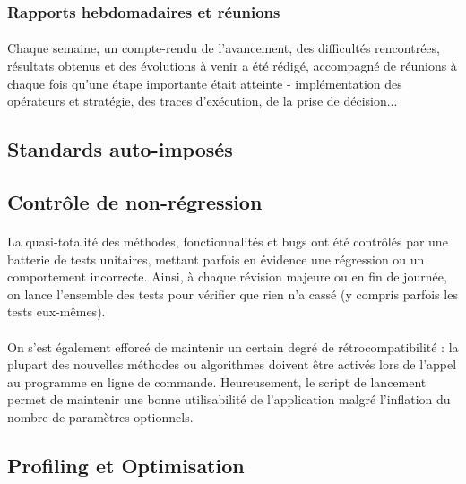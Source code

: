 \documentclass[a4paper,10pt]{report}
\begin{document}
\subsubsection{Rapports hebdomadaires et réunions}
\paragraph{}
  Chaque semaine, un compte-rendu de l'avancement, des difficultés rencontrées,
résultats obtenus et des évolutions à venir a été rédigé, accompagné de
réunions à chaque fois qu'une étape importante était atteinte - implémentation
des opérateurs et stratégie, des traces d'exécution, de la prise de décision...


\subsection{Standards auto-imposés}
\paragraph{}



\subsection{Contrôle de non-régression}
\paragraph{}
  La quasi-totalité des méthodes, fonctionnalités et bugs ont été contrôlés par
une batterie de tests unitaires, mettant parfois en évidence une régression ou
un comportement incorrecte. Ainsi, à chaque révision majeure ou en fin de
journée, on lance l'ensemble des tests pour vérifier que rien n'a cassé (y
compris parfois les tests eux-mêmes).

\paragraph{}
  On s'est également efforcé de maintenir un certain degré de rétrocompatibilité
: la plupart des nouvelles méthodes ou algorithmes doivent être activés lors de
l'appel au programme en ligne de commande. Heureusement, le script de lancement
permet de maintenir une bonne utilisabilité de l'application malgré l'inflation
du nombre de paramètres optionnels.

\subsection{Profiling et Optimisation}
\end{document}
